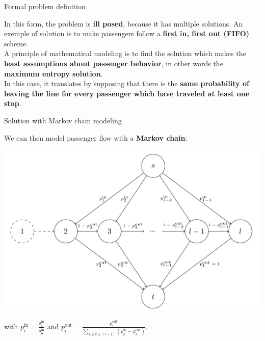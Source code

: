 \documentclass[10pt]{beamer}
\newcommand{\imp}[1]{\textbf{\color{cyan}#1}}
\begin{document}
	
	\begin{frame}{Formal problem definition}
		
		In this form, the problem is \imp{ill posed}, because it has multiple solutions. An exemple of solution is to make passengers follow a \imp{first in, first out (FIFO)} scheme. \\
		\vspace{0.4cm}
		A principle of mathematical modeling is to find the solution which makes the \imp{least assumptions about passenger behavior}, in other words the \imp{maximum entropy solution}. \\
		\vspace{0.4cm}
		In this case, it translates by supposing that there is the \imp{same probability of leaving the line for every passenger which have traveled at least one stop}.
		
	\end{frame}
	
	
	\begin{frame}{Solution with Markov chain modeling}
		
		We can then model passenger flow with a \imp{Markov chain}:
		
		\begin{center}
			\includegraphics[width=0.8\linewidth]{img/line_markov.png} 
		\end{center}
		
		with $p^\text{in}_i = \frac{\rho^\text{in}_i}{\rho^\text{in}_\bullet}$ and $p^\text{out}_i = \frac{\rho^\text{out}_i}{\sum_{1 \leq k \leq (i-1)} (\rho^\text{in}_k - \rho^\text{out}_k)}$.
	\end{frame}
	
	
\end{document}
